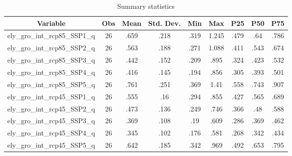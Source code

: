 \begin{table}[htbp]\centering \caption{Summary statistics\label{sumstat}}
\begin{tabular}{l c c c c c c c c}\hline\hline
\multicolumn{1}{c}{Variable} & Obs & Mean & Std. Dev.
 & Min & Max & P25 & P50 & P75  \\ \hline
ely\_gro\_int\_rcp85\_SSP1\_q & 26 & .659 & .218 & .319 & 1.245 & .479 & .64 & .786 \\
ely\_gro\_int\_rcp85\_SSP2\_q & 26 & .563 & .188 & .271 & 1.088 & .411 & .543 & .674 \\
ely\_gro\_int\_rcp85\_SSP3\_q & 26 & .442 & .152 & .209 & .895 & .324 & .423 & .532 \\
ely\_gro\_int\_rcp85\_SSP4\_q & 26 & .416 & .145 & .194 & .856 & .305 & .393 & .501 \\
ely\_gro\_int\_rcp85\_SSP5\_q & 26 & .761 & .251 & .369 & 1.41 & .558 & .743 & .907 \\
ely\_gro\_int\_rcp45\_SSP1\_q & 26 & .555 & .16 & .294 & .855 & .427 & .565 & .689 \\
ely\_gro\_int\_rcp45\_SSP2\_q & 26 & .473 & .136 & .249 & .746 & .366 & .48 & .588 \\
ely\_gro\_int\_rcp45\_SSP3\_q & 26 & .369 & .108 & .19 & .609 & .286 & .369 & .462 \\
ely\_gro\_int\_rcp45\_SSP4\_q & 26 & .345 & .102 & .176 & .581 & .268 & .342 & .434 \\
ely\_gro\_int\_rcp45\_SSP5\_q & 26 & .642 & .185 & .342 & .969 & .492 & .653 & .795 \\
\hline\end{tabular}
\end{table}
